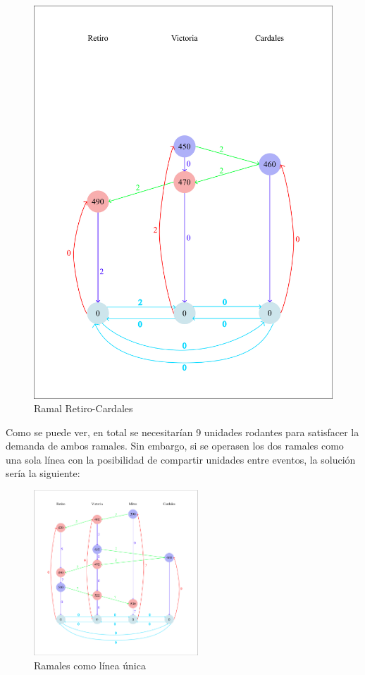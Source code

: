 \documentclass{article}
\begin{document}
\begin{figure}[H]
\begin{minipage}{0.45\textwidth}
        \includegraphics[width=\textwidth]{Retiro-Cardales.png}
        \caption{Ramal Retiro-Cardales}
        \label{fig:grafico2}
    \end{minipage}
    \label{fig:dos_graficos}
\end{figure}

Como se puede ver, en total se necesitarían 9 unidades rodantes para satisfacer la demanda de ambos ramales. Sin embargo, si se operasen los dos ramales como una sola línea con la posibilidad de compartir unidades entre eventos, la solución sería la siguiente:

\begin{figure}[H]
    \centering
    \includegraphics[width=0.55\textwidth]{ramales_juntos.png}
    \caption{Ramales como línea única}
    \label{fig:ejemplo}
\end{figure}
\end{document}
